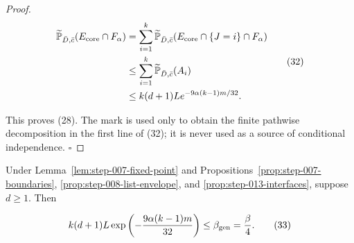 \begin{proof}
\[
\begin{aligned}
 \widetilde{\mathbb P}_{\bar D,\bar c}
   (E_{\rm core}\cap F_\alpha)
 &=\sum_{i=1}^k
   \widetilde{\mathbb P}_{\bar D,\bar c}
   (E_{\rm core}\cap\{J=i\}\cap F_\alpha)\\
 &\leq\sum_{i=1}^k
   \widetilde{\mathbb P}_{\bar D,\bar c}(A_i)\\
 &\leq k(d+1)L e^{-9\alpha(k-1)m/32}.
\end{aligned}
 \tag{32}
\]

This proves (28). The mark is used only to obtain the finite pathwise
decomposition in the first line of (32); it is never used as a source of
conditional independence. \(\square\)


\end{proof}

\begin{lemma}\label{lem:step-013-beta-gen}
Under Lemma~\ref{lem:step-007-fixed-point} and
Propositions~\ref{prop:step-007-boundaries},
\ref{prop:step-008-list-envelope}, and
\ref{prop:step-013-interfaces}, suppose \(d\geq1\). Then

\[
 k(d+1)L
 \exp\left(-\frac{9\alpha(k-1)m}{32}\right)
 \leq\beta_{\rm gen}=\frac\beta4.
 \tag{33}
\]


\end{lemma}

